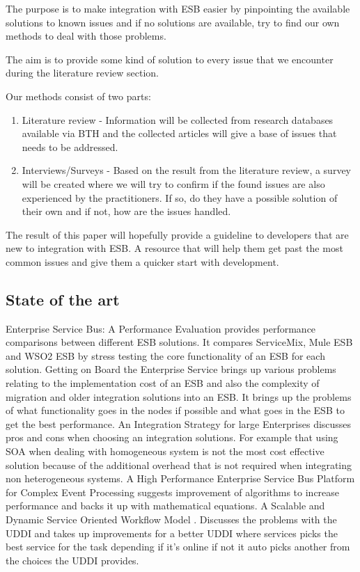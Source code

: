 \documentclass{llncs}
\begin{document}
The purpose is to make integration with ESB easier by pinpointing the available solutions to known issues and if no solutions are available, try to find our own methods to deal with those problems.

The aim is to provide some kind of solution to every issue that we encounter during the literature review section.

Our methods consist of two parts:
\begin{enumerate}
 \item Literature review - Information will be collected from research databases available via BTH and the collected articles will give a base of issues that needs to be addressed.
 \item Interviews/Surveys - Based on the result from the literature review, a survey will be created where we will try to confirm if the found issues are also experienced by the practitioners. If so, do they have a possible solution of their own and if not, how are the issues handled.
\end{enumerate}
The result of this paper will hopefully provide a guideline to developers that are new to integration with ESB. A resource that will help them get past the most common issues and give them a quicker start with development.


\subsection{State of the art}

Enterprise Service Bus: A Performance Evaluation \cite{sanjay11} provides performance comparisons between different ESB solutions. It compares ServiceMix\cite{servicemix}, Mule ESB\cite{mule} and WSO2 ESB\cite{wso2} by stress testing the core functionality of an ESB for each solution. Getting on Board the Enterprise Service \cite{ortiz07} brings up various problems relating to the implementation cost of an ESB and also the complexity of migration and older integration solutions into an ESB. It brings up the problems of what functionality goes in the nodes if possible and what goes in the ESB to get the best performance. An Integration Strategy for large Enterprises \cite{risimic06} discusses pros and cons when choosing an integration solutions. For example that using SOA when dealing with homogeneous system is not the most cost effective solution because of the additional overhead that is not required when integrating non heterogeneous systems. A High Performance Enterprise Service Bus Platform for Complex Event Processing \cite{bo08} suggests improvement of algorithms to increase performance and backs it up with mathematical equations. A Scalable and Dynamic Service Oriented Workflow Model \cite{yang11}. Discusses the problems with the UDDI and takes up improvements for a better UDDI where services picks the best service for the task depending if it’s online if not it auto picks another from the choices the UDDI provides. 
\end{document}
